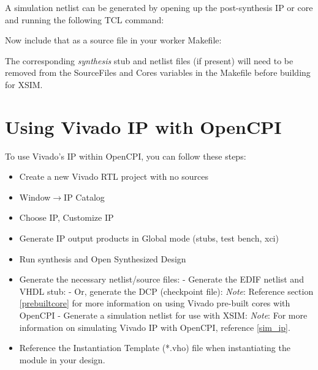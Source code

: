 \begin{flushleft}
A simulation netlist can be generated by opening up the post-synthesis IP or core and running the following TCL command:\newline
{}\newline

Now include that as a source file in your worker Makefile:\newline {}\newline

The corresponding \textit{synthesis} stub and netlist files (if present) will need to be removed from the SourceFiles and Cores variables in the Makefile before building for XSIM.

\section{Using Vivado IP with OpenCPI}
To use Vivado's IP within OpenCPI, you can follow these steps:
\begin{itemize}
\item Create a new Vivado RTL project with no sources
\item Window$\rightarrow$IP Catalog
\item Choose IP, Customize IP
\item Generate IP output products in Global mode (stubs, test bench, xci)
\item Run synthesis and Open Synthesized Design
\item Generate the necessary netlist/source files:
\subitem - Generate the EDIF netlist and VHDL stub:
\subsubitem {}
\subsubitem {}
\subitem - Or, generate the DCP (checkpoint file):
\subsubitem {}
\subitem  \textit{Note}: Reference section \ref{prebuiltcore} for more information on using Vivado pre-built cores with OpenCPI
\subitem - Generate a simulation netlist for use with XSIM:
\subsubitem {}
\subsubitem \textit{Note}: For more information on simulating Vivado IP with OpenCPI, reference \ref{sim_ip}.
\item Reference the Instantiation Template (*.vho) file when instantiating the module in your design.
\end{itemize}


\end{flushleft}
